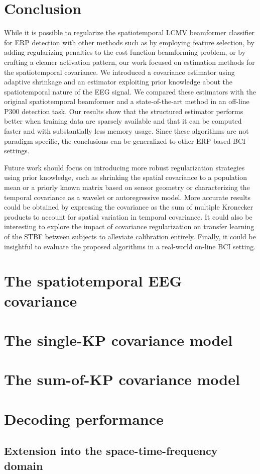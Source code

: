 \begin{refsection}
	\section{Conclusion}
	While it is possible to regularize the spatiotemporal LCMV beamformer
	classifier for ERP detection with other methods such as by employing feature selection,
	by adding regularizing penalties to the cost
	function beamforming problem, or by crafting a cleaner activation pattern, our work focused on
	estimation methods for the spatiotemporal covariance.
	We introduced a covariance estimator using adaptive shrinkage and an
	estimator exploiting prior knowledge about the spatiotemporal nature of the EEG
	signal.
	We compared these estimators with the original spatiotemporal
	beamformer and a state-of-the-art method in an off-line P300 detection task.
	Our results show that the structured estimator performs better when training data are sparsely available and that it can be computed faster and with substantially less memory usage.
	Since these algorithms are not paradigm-specific,  the conclusions can be generalized to
	other ERP-based BCI settings.

	Future work should focus on introducing more robust regularization strategies using prior knowledge, such as shrinking the spatial covariance to a population mean or a priorly known matrix based on sensor geometry or characterizing the temporal covariance as a wavelet or autoregressive model.
	More accurate results could be obtained by expressing the covariance as the sum of multiple Kronecker products to account for spatial variation in temporal
	covariance.
	It could also be interesting to explore the impact of covariance regularization on transfer learning of the STBF between subjects to alleviate calibration entirely.
	Finally, it could be insightful to evaluate the proposed algorithms in a
	real-world on-line BCI setting.

	\section{The spatiotemporal EEG covariance}
	\section{The single-KP covariance model}
	\section{The sum-of-KP covariance model}
	\section{Decoding performance}
	\subsection{Extension into the space-time-frequency domain}
	\printbibliography
\end{refsection}
